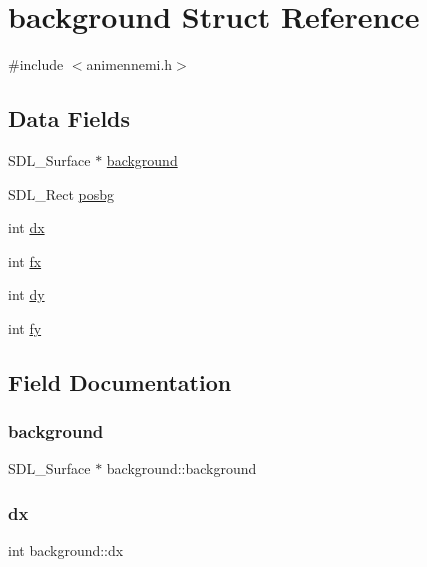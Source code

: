 \hypertarget{structbackground}{}\section{background Struct Reference}
\label{structbackground}


{\ttfamily \#include $<$animennemi.\+h$>$}

\subsection*{Data Fields}
\begin{DoxyCompactItemize}
\item 
S\+D\+L\+\_\+\+Surface $\ast$ \hyperlink{structbackground_a6511affeeaa8a9abf07ac9b709075c8b}{background}
\item 
S\+D\+L\+\_\+\+Rect \hyperlink{structbackground_a54134b1806f4894024b03d480ebe1b6b}{posbg}
\item 
int \hyperlink{structbackground_a3afc10b3a1fa523b874e08d40f75e1a7}{dx}
\item 
int \hyperlink{structbackground_a81b2b6107bd84a5246251e975bd25914}{fx}
\item 
int \hyperlink{structbackground_a060b0876d21025fb57566f0d89add548}{dy}
\item 
int \hyperlink{structbackground_ad44a25e18db23c9b04196652482b6087}{fy}
\end{DoxyCompactItemize}


\subsection{Field Documentation}
\mbox{\label{structbackground_a6511affeeaa8a9abf07ac9b709075c8b}} 
\subsubsection{\texorpdfstring{background}{background}}
{\footnotesize\ttfamily S\+D\+L\+\_\+\+Surface $\ast$ background\+::background}

\mbox{\label{structbackground_a3afc10b3a1fa523b874e08d40f75e1a7}} 
\subsubsection{\texorpdfstring{dx}{dx}}
{\footnotesize\ttfamily int background\+::dx}

